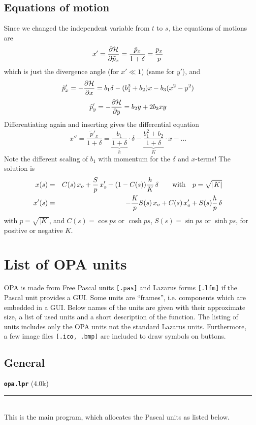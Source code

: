 \documentclass[12pt]{article}
\newcommand\beq{\begin{equation}}
\newcommand\eeq{\end{equation}}
\newcommand\code[1]{{\tt [#1]}}
\newcommand\opamoduleN[2]{{\bf \tt #1} #2\\  \rule[3pt]{\textwidth}{0.2pt} \\}
\begin{document}
\subsection{Equations of motion}
Since we changed the independent variable from $t$ to $s$, the equations of motions are
\beq
x'=\frac{\partial {\cal H}}{\partial \tilde{p}_x}= \frac{\tilde{p}_x}{1+\delta}=\frac{p_x}{p}
\eeq
which is just the divergence angle (for $x'\ll 1$) (same for $y'$), and
\beq
\tilde{p}_x'=-\frac{\partial {\cal H}}{\partial x} = b_1\delta -(b_1^2+b_2)x - b_3(x^2-y^2)
\eeq
\beq
\tilde{p}_y'=-\frac{\partial {\cal H}}{\partial y} = b_2 y + 2b_3 xy
\eeq
Differentiating again and inserting gives the differential equation
\beq
x''= \frac{\tilde{p}'_x}{1+\delta} = \underbrace{\frac{b_1}{1+\delta}}_{h}\cdot\delta - \underbrace{\frac{b_1^2+b_2}{1+\delta}}_{K}\cdot x - \dots
\eeq
Note the different scaling of $b_1$ with momentum for the $\delta$ and $x$-terms! The solution is
\begin{eqnarray}
\label{eq:eqmo}
x(s) & = & C(s)\,x_o +  \frac{S}{p}\,x_o'  + (1-C(s))\frac{h}{K}\,\delta
\qquad \mbox{\rm with}\quad p=\sqrt{|K|} \\
x'(s) & = & -\frac{K}{p}S(s)\, x_o + C(s)\, x_o' + S(s)\frac{h}{p}\,\delta \nonumber
\end{eqnarray}
with $p=\sqrt{|K|}$, and $C(s)=\cos ps$ or $\cosh ps$, $S(s)=\sin ps$ or $\sinh ps$, for positive or negative $K$.




\section{\label{appunits}List of OPA units}

OPA is made from Free Pascal units \code{.pas} and Lazarus forms \code{.lfm} if the Pascal unit provides a GUI. Some units are ``frames'', i.e. components which are embedded in a GUI.
Below names of the units are given with their approximate size, a list of used units and a short description of the function. The listing of units includes only the OPA units not the standard Lazarus units. Furthermore, a few image files \code{.ico, .bmp} are included to draw symbols on buttons.

\subsection{General}

\opamoduleN{opa.lpr}{(4.0k)}
This is the main program, which allocates the Pascal units as listed below.\\
\end{document}
